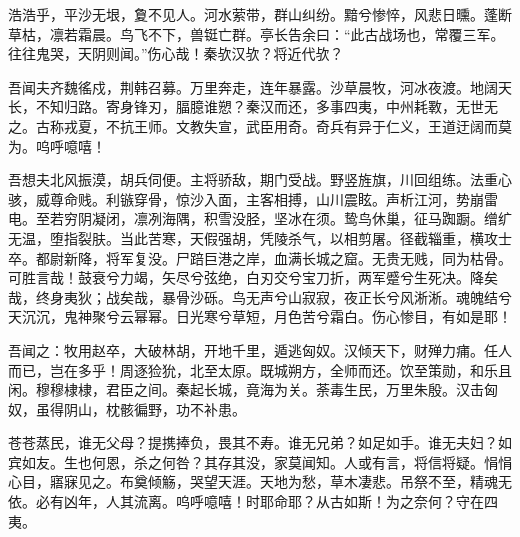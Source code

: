 
浩浩乎，平沙无垠，夐不见人。河水萦带，群山纠纷。黯兮惨悴，风悲日曛。蓬断草枯，凛若霜晨。鸟飞不下，兽铤亡群。亭长告余曰：“此古战场也，常覆三军。往往鬼哭，天阴则闻。”伤心哉！秦欤汉欤？将近代欤？

吾闻夫齐魏徭戍，荆韩召募。万里奔走，连年暴露。沙草晨牧，河冰夜渡。地阔天长，不知归路。寄身锋刃，腷臆谁愬？秦汉而还，多事四夷，中州耗斁，无世无之。古称戎夏，不抗王师。文教失宣，武臣用奇。奇兵有异于仁义，王道迂阔而莫为。呜呼噫嘻！

吾想夫北风振漠，胡兵伺便。主将骄敌，期门受战。野竖旌旗，川回组练。法重心骇，威尊命贱。利镞穿骨，惊沙入面，主客相搏，山川震眩。声析江河，势崩雷电。至若穷阴凝闭，凛冽海隅，积雪没胫，坚冰在须。鸷鸟休巢，征马踟蹰。缯纩无温，堕指裂肤。当此苦寒，天假强胡，凭陵杀气，以相剪屠。径截辎重，横攻士卒。都尉新降，将军复没。尸踣巨港之岸，血满长城之窟。无贵无贱，同为枯骨。可胜言哉！鼓衰兮力竭，矢尽兮弦绝，白刃交兮宝刀折，两军蹙兮生死决。降矣哉，终身夷狄；战矣哉，暴骨沙砾。鸟无声兮山寂寂，夜正长兮风淅淅。魂魄结兮天沉沉，鬼神聚兮云幂幂。日光寒兮草短，月色苦兮霜白。伤心惨目，有如是耶！

吾闻之：牧用赵卒，大破林胡，开地千里，遁逃匈奴。汉倾天下，财殚力痡。任人而已，岂在多乎！周逐猃狁，北至太原。既城朔方，全师而还。饮至策勋，和乐且闲。穆穆棣棣，君臣之间。秦起长城，竟海为关。荼毒生民，万里朱殷。汉击匈奴，虽得阴山，枕骸徧野，功不补患。

苍苍蒸民，谁无父母？提携捧负，畏其不寿。谁无兄弟？如足如手。谁无夫妇？如宾如友。生也何恩，杀之何咎？其存其没，家莫闻知。人或有言，将信将疑。悁悁心目，寤寐见之。布奠倾觞，哭望天涯。天地为愁，草木凄悲。吊祭不至，精魂无依。必有凶年，人其流离。呜呼噫嘻！时耶命耶？从古如斯！为之奈何？守在四夷。
